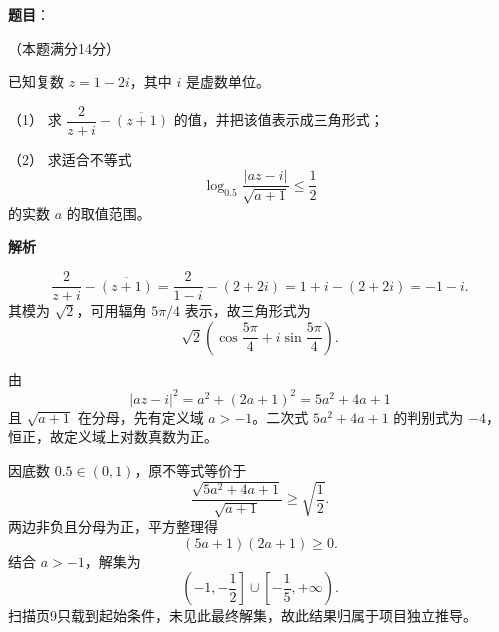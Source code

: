 \begin{answer}

\textbf{题目}：

（本题满分14分）

已知复数 $z=1-2i$，其中 $i$ 是虚数单位。

（1） 求 $\dfrac2{z+i}-\overline{(z+1)}$ 的值，并把该值表示成三角形式；

（2） 求适合不等式
\nopagebreak[4]
\[
\log_{0.5}\frac{|az-i|}{\sqrt{a+1}}\le\frac12
\]
的实数 $a$ 的取值范围。

\textbf{解析}


\nopagebreak[4]
\[
\frac2{z+i}-\overline{(z+1)}
=\frac2{1-i}-(2+2i)
=1+i-(2+2i)
=-1-i.
\]
其模为 $\sqrt2$，可用辐角 $5\pi/4$ 表示，故三角形式为
\nopagebreak[4]
\[
\sqrt2\left(\cos\frac{5\pi}{4}+i\sin\frac{5\pi}{4}\right).
\]


由
\nopagebreak[4]
\[
|az-i|^2=a^2+(2a+1)^2=5a^2+4a+1
\]
且 $\sqrt{a+1}$ 在分母，先有定义域 $a>-1$。二次式 $5a^2+4a+1$ 的判别式为 $-4$，恒正，故定义域上对数真数为正。

因底数 $0.5\in(0,1)$，原不等式等价于
\nopagebreak[4]
\[
\frac{\sqrt{5a^2+4a+1}}{\sqrt{a+1}}\ge\sqrt{\frac12}.
\]
两边非负且分母为正，平方整理得
\nopagebreak[4]
\[
(5a+1)(2a+1)\ge0.
\]
结合 $a>-1$，解集为
\nopagebreak[4]
\[
\left(-1,-\frac12\right]\cup\left[-\frac15,+\infty\right).
\]
扫描页9只载到起始条件，未见此最终解集，故此结果归属于项目独立推导。


\gkanswer{答案（2）：$a\in\left(-1,-\dfrac12\right]\cup\left[-\dfrac15,+\infty\right)$}

\end{answer}
